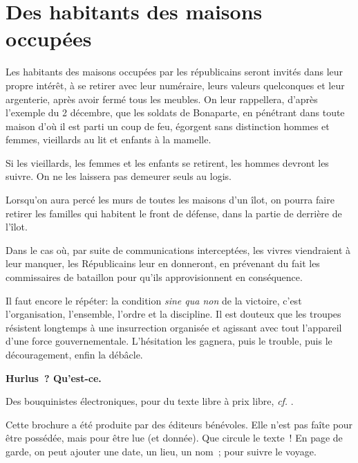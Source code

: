 \documentclass[french,twoside]{book} %
\begin{document}
\section[{Des habitants des maisons occupées}]{Des habitants des maisons occupées}\renewcommand{\leftmark}{Des habitants des maisons occupées}

\noindent Les habitants des maisons occupées par les républicains seront invités dans leur propre intérêt, à se retirer avec leur numéraire, leurs valeurs quelconques et leur argenterie, après avoir fermé tous les meubles. On leur rappellera, d’après l’exemple du 2 décembre, que les soldats de Bonaparte, en pénétrant dans toute maison d’où il est parti un coup de feu, égorgent sans distinction hommes et femmes, vieillards au lit et enfants à la mamelle.\par
Si les vieillards, les femmes et les enfants se retirent, les hommes devront les suivre. On ne les laissera pas demeurer seuls au logis.\par
Lorsqu’on aura percé les murs de toutes les maisons d’un îlot, on pourra faire retirer les familles qui habitent le front de défense, dans la partie de derrière de l’îlot.\par
Dans le cas où, par suite de communications interceptées, les vivres viendraient à leur manquer, les Républicains leur en donneront, en prévenant du fait les commissaires de bataillon pour qu’ils approvisionnent en conséquence.\par
Il faut encore le répéter: la condition \emph{sine qua non} de la victoire, c’est l’organisation, l’ensemble, l’ordre et la discipline. Il est douteux que les troupes résistent longtemps à une insurrection organisée et agissant avec tout l’appareil d’une force gouvernementale. L'hésitation les gagnera, puis le trouble, puis le découragement, enfin la débâcle.
 


\ifbooklet
  \clearpage
  \pagestyle{empty}
  \hbox{}\newpage
  \ifodd\value{page}\hbox{}\newpage\fi
  {\centering\color{rubric}\bfseries\noindent\large
    Hurlus ? Qu’est-ce.\par
    \bigskip
  }
  \noindent Des bouquinistes électroniques, pour du texte libre à prix libre,
  \textit{cf.} \href{https://hurlus.fr}{}.\par
  \bigskip
  \noindent Cette brochure a été produite par des éditeurs bénévoles.
  Elle n’est pas faîte pour être possédée, mais pour être lue (et donnée).
  Que circule le texte !
  En page de garde, on peut ajouter une date, un lieu, un nom ;
  pour suivre le voyage.
  \par
\end{document}
